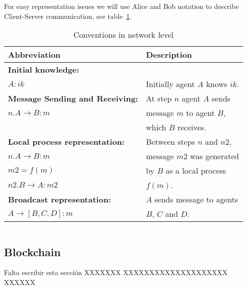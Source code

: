 For easy representation issues we will use Alice and Bob notation to 
describe Client-Server communication, see table~\ref{table:NetConventions}.
\begin{table}[htb]
\footnotesize
\begin{center}
\caption{Conventions in network level}
\label{table:NetConventions}
\begin{tabular}{|l|l|}
\hline
{\bf Abbreviation}                      & {\bf Description}                    \\\hline\hline
\textbf{Initial knowledge:}             &                                      \\
$A : ik$                                &  Initially agent $A$ knows $ik$.    \\ \hline 
\textbf{Message Sending and Receiving:} &  At step $n$ agent $A$ sends         \\ 
$n. A \rightarrow B: m$                 &  message $m$ to agent $B$,\\
                                        &  which $B$ receives.      \\ \hline 
\textbf{Local process representation:}  &  Between steps $n$ and $n2$,    \\ 
$n. A\rightarrow B: m$                  &  message $m2$ was generated \\ 
\hspace{5mm}$m2 = f(m)$                 &  by $B$ as a local process \\ 
$n2. B\rightarrow A: m2$                &  $f(m)$.                  \\ \hline 
\textbf{Broadcast representation:}      &  $A$ sends message to agents\\ 
$A \rightarrow [B, C, D]: m$            &  $B$, $C$ and $D$.\\ \hline \hline 
\end{tabular}
\end{center}
\end{table}
\normalsize


$$$$



\subsection{Blockchain}
Falta escribir esta sección XXXXXXX
XXXXXXXXXXXXXXXXXXXX
XXXXXX





